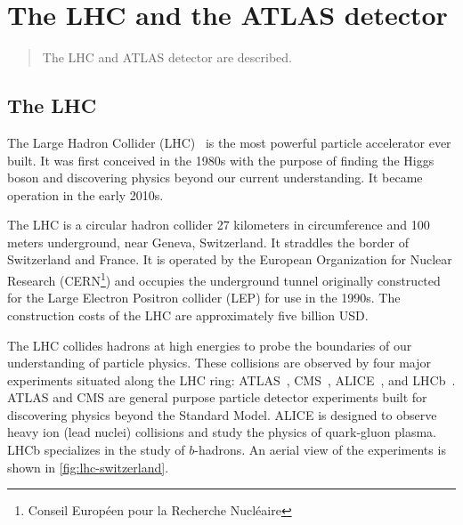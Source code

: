 \chapter[The LHC and the ATLAS detector][The LHC and the ATLAS detector]{The LHC and the ATLAS detector}
\label{chap:lhcatlas}

\begin{quote}
  The LHC and ATLAS detector are described.
\end{quote}
 
\section{The LHC}
\label{sec:lhc}

The Large Hadron Collider (LHC)~\cite{cern-jinst-lhc} is the most powerful particle accelerator ever built. It was first conceived in the 1980s with the purpose of finding the Higgs boson and discovering physics beyond our current understanding. It became operation in the early 2010s.

The LHC is a circular hadron collider 27 kilometers in circumference and 100 meters underground, near Geneva, Switzerland. It straddles the border of Switzerland and France. It is operated by the European Organization for Nuclear Research (CERN\footnote{Conseil Europ\'een pour la Recherche Nucl\'eaire}) and occupies the underground tunnel originally constructed for the Large Electron Positron collider (LEP) for use in the 1990s. The construction costs of the LHC are approximately five billion USD.

The LHC collides hadrons at high energies to probe the boundaries of our understanding of particle physics. These collisions are observed by four major experiments situated along the LHC ring: ATLAS~\cite{cern-jinst-atlas}, CMS~\cite{cern-jinst-cms}, ALICE~\cite{cern-jinst-alice}, and LHCb~\cite{cern-jinst-lhcb}. ATLAS and CMS are general purpose particle detector experiments built for discovering physics beyond the Standard Model. ALICE is designed to observe heavy ion (lead nuclei) collisions and study the physics of quark-gluon plasma. LHCb specializes in the study of $b$-hadrons. An aerial view of the experiments is shown in \cref{fig:lhc-switzerland}.

